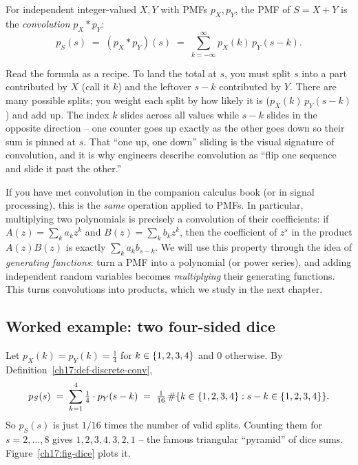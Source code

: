 \begin{definition}
\label{ch17:def-discrete-conv}
For independent integer-valued $X,Y$ with PMFs $p_X,p_Y$, the PMF of
$S=X+Y$ is the \emph{convolution} $p_X * p_Y$:
\[
p_S(s) \;=\; (p_X * p_Y)(s) \;=\; \sum_{k=-\infty}^{\infty} p_X(k)\,p_Y(s-k).
\]
\end{definition}

\begin{happeningbox}
Read the formula as a recipe. To land the total at $s$, you must split $s$
into a part contributed by $X$ (call it $k$) and the leftover $s-k$
contributed by $Y$. There are many possible splits; you weight each split
by how likely it is ($p_X(k)\,p_Y(s-k)$) and add up. The index $k$ slides
across all values while $s-k$ slides in the opposite direction -- one
counter goes up exactly as the other goes down so their sum is pinned at
$s$. That ``one up, one down'' sliding is the visual signature of
convolution, and it is why engineers describe convolution as ``flip one
sequence and slide it past the other.''
\end{happeningbox}

\begin{connectionbox}
If you have met convolution in the companion calculus book (or in signal
processing), this is the \emph{same} operation applied to PMFs.
In particular, multiplying two polynomials is precisely a convolution of their
coefficients: if
$A(z)=\sum_k a_k z^k$ and $B(z)=\sum_k b_k z^k$, then the coefficient of
$z^s$ in the product $A(z)B(z)$ is exactly $\sum_k a_k b_{s-k}$. We will use this
property through the idea of \emph{generating functions}: turn a PMF into a
polynomial (or power series), and adding independent random variables
becomes \emph{multiplying} their generating functions. This turns
convolutions into products, which we study in the next chapter.
\end{connectionbox}

\subsection{Worked example: two four-sided dice}

Let $p_X(k)=p_Y(k)=\tfrac14$ for $k\in\{1,2,3,4\}$ and $0$ otherwise.
By Definition~\ref{ch17:def-discrete-conv},
\[
p_S(s) \;=\; \sum_{k=1}^{4} \tfrac14 \cdot p_Y(s-k)
        \;=\; \tfrac{1}{16}\,\#\{k\in\{1,2,3,4\} : s-k \in \{1,2,3,4\}\}.
\]
So $p_S(s)$ is just $1/16$ times the number of valid splits. Counting them
for $s=2,\dots,8$ gives $1,2,3,4,3,2,1$ -- the famous triangular
``pyramid'' of dice sums. Figure~\ref{ch17:fig-dice} plots it.

